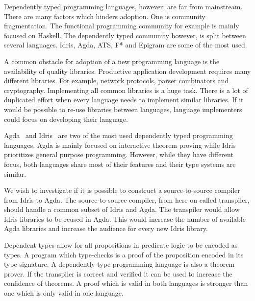 \documentclass[parskip=half]{scrartcl}
\begin{document}
Dependently typed programming languages, however, are far from mainstream.
There are many factors which hinders adoption. One is community fragmentation.
The functional programming community for example is mainly focused on Haskell.
The dependently typed community however, is split between several languages.
Idris, Agda, ATS, F* and Epigram are some of the most used.

A common obstacle for adoption of a new programming language is the
availability of quality libraries. Productive application development requires
many different libraries.  For example, network protocols, parser combinators
and cryptography.  Implementing all common libraries is a huge task.  There is
a lot of duplicated effort when every language needs to implement similar
libraries.  If it would be possible to re-use libraries between languages,
language implementers could focus on developing their language.

Agda~\cite{agda} and Idris~\cite{idris} are two of the most used dependently
typed programming languages.  Agda is mainly focused on interactive theorem
proving while Idris prioritizes general purpose programming.  However, while
they have different focus, both languages share most of their features and
their type systems are similar.

We wish to investigate if it is possible to construct a source-to-source
compiler from Idris to Agda. The source-to-source compiler, from here on called
transpiler, should handle a common subset of Idris and Agda.  The transpiler
would allow Idris libraries to be reused in Agda. This would increase the
number of available Agda libraries and increase the audience for every new
Idris library.

Dependent types allow for all propositions in predicate logic to be encoded as
types. A program which type-checks is a proof of the proposition encoded in
its type signature. A dependently type programming language is also a theorem
prover. If the transpiler is correct and verified it can be used to increase
the confidence of theorems. A proof which is valid in both languages is
stronger than one which is only valid in one language.
\end{document}
